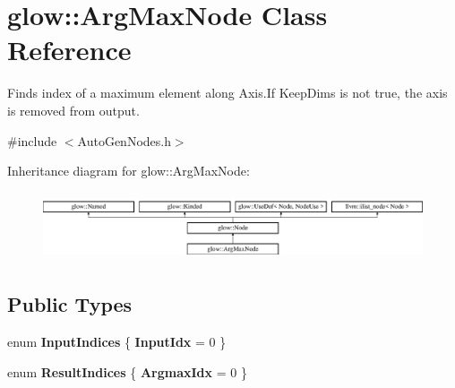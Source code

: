 \hypertarget{classglow_1_1_arg_max_node}{}\section{glow\+:\+:Arg\+Max\+Node Class Reference}
\label{classglow_1_1_arg_max_node}


Finds index of a maximum element along Axis.\+If Keep\+Dims is not true, the axis is removed from output.  




{\ttfamily \#include $<$Auto\+Gen\+Nodes.\+h$>$}

Inheritance diagram for glow\+:\+:Arg\+Max\+Node\+:\begin{figure}[H]
\begin{center}
\leavevmode
\includegraphics[height=2.028986cm]{classglow_1_1_arg_max_node}
\end{center}
\end{figure}
\subsection*{Public Types}
\begin{DoxyCompactItemize}
\item 
\mbox{\label{classglow_1_1_arg_max_node_ae45b3a014df6779e574f30b398dce292}} 
enum {\bfseries Input\+Indices} \{ {\bfseries Input\+Idx} = 0
 \}
\item 
\mbox{\label{classglow_1_1_arg_max_node_aa3377c9258b26f5481c43103e265121f}} 
enum {\bfseries Result\+Indices} \{ {\bfseries Argmax\+Idx} = 0
 \}
\end{DoxyCompactItemize}
